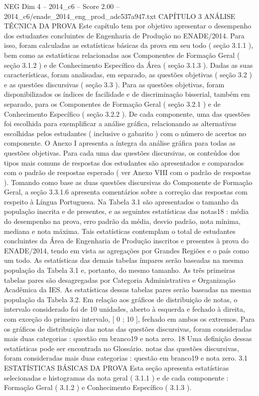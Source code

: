\begin{textsample}{NEG Dim 4 – 2014\_c6 – Score 2.00 – 2014\_c6/enade\_2014\_eng\_prod\_adc537a947.txt}  \label{ex:f4_neg_288}
CAPÍTULO 3 ANÁLISE TÉCNICA DA PROVA Este capítulo tem por objetivo apresentar o desempenho dos estudantes concluintes de Engenharia de Produção no ENADE/2014.
Para isso, foram calculadas as estatísticas básicas da prova em seu todo ( seção 3.1.1 ), bem como as estatísticas relacionadas aos Componentes de Formação Geral ( seção 3.1.2 ) e de Conhecimento Específico da Área ( seção 3.1.3 ).
Dadas as suas características, foram analisadas, em separado, as questões objetivas ( seção 3.2 ) e as questões discursivas ( seção 3.3 ).
Para as questões objetivas, foram disponibilizados os índices de facilidade e de discriminação bisserial, também em separado, para os Componentes de Formação Geral ( seção 3.2.1 ) e de Conhecimento Específico ( seção 3.2.2 ).
De cada componente, uma das questões foi escolhida para exemplificar a análise gráfica, relacionando as alternativas escolhidas pelos estudantes ( inclusive o gabarito ) com o número de acertos no componente.
O Anexo I apresenta a íntegra da análise gráfica para todas as questões objetivas.
Para cada uma das questões discursivas, os conteúdos dos tipos mais comuns de respostas dos estudantes são apresentados e comparados com o padrão de respostas esperado ( ver Anexo VIII com o padrão de respostas ).
Tomando como base as duas questões discursivas do Componente de Formação Geral, a seção 3.3.1.6 apresenta comentários sobre a correção das respostas com respeito à Língua Portuguesa.
Na Tabela 3.1 são apresentados o tamanho da população inscrita e de presentes, e as seguintes estatísticas das notas18 : média do desempenho na prova, erro padrão da média, desvio padrão, nota mínima, mediana e nota máxima.
Tais estatísticas contemplam o total de estudantes concluintes da Área de Engenharia de Produção inscritos e presentes à prova do ENADE/2014, tendo em vista as agregações por Grandes Regiões e o país como um todo.
As estatísticas das demais tabelas ímpares serão baseadas na mesma população da Tabela 3.1 e, portanto, do mesmo tamanho.
As três primeiras tabelas pares são desagregadas por Categoria Administrativa e Organização Acadêmica da IES.
As estatísticas dessas tabelas pares serão baseadas na mesma população da Tabela 3.2.
Em relação aos gráficos de distribuição de notas, o intervalo considerado foi de 10 unidades, aberto à esquerda e fechado à direita, com exceção do primeiro intervalo, [ 0 ; 10 ], fechado em ambos os extremos.
Para os gráficos de distribuição das notas das questões discursivas, foram consideradas mais duas categorias : questão em branco19 e nota zero. 18 Uma definição dessas estatísticas pode ser encontrada no Glossário. notas das questões discursivas, foram consideradas mais duas categorias : questão em branco19 e nota zero. 3.1 ESTATÍSTICAS BÁSICAS DA PROVA Esta seção apresenta estatísticas selecionadas e histogramas da nota geral ( 3.1.1 ) e de cada componente : Formação Geral ( 3.1.2 ) e Conhecimento Específico ( 3.1.3 ).

\end{textsample}
